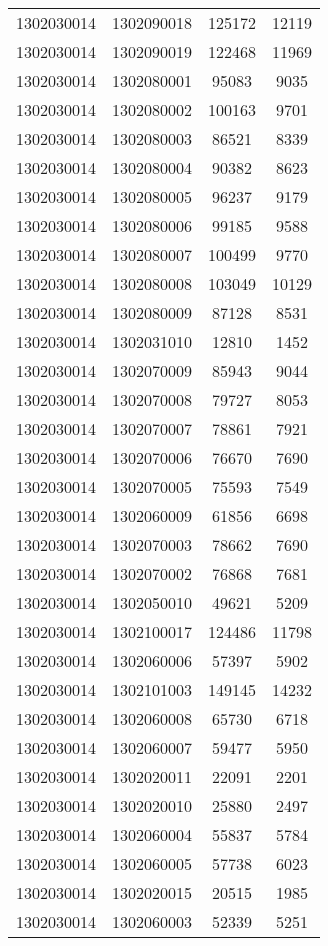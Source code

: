 \begin{longtable}[h]{llcc}
		1302030014 & 1302090018 & 125172 & 12119\\
		1302030014 & 1302090019 & 122468 & 11969\\
		1302030014 & 1302080001 & 95083 & 9035\\
		1302030014 & 1302080002 & 100163 & 9701\\
		1302030014 & 1302080003 & 86521 & 8339\\
		1302030014 & 1302080004 & 90382 & 8623\\
		1302030014 & 1302080005 & 96237 & 9179\\
		1302030014 & 1302080006 & 99185 & 9588\\
		1302030014 & 1302080007 & 100499 & 9770\\
		1302030014 & 1302080008 & 103049 & 10129\\
		1302030014 & 1302080009 & 87128 & 8531\\
		1302030014 & 1302031010 & 12810 & 1452\\
		1302030014 & 1302070009 & 85943 & 9044\\
		1302030014 & 1302070008 & 79727 & 8053\\
		1302030014 & 1302070007 & 78861 & 7921\\
		1302030014 & 1302070006 & 76670 & 7690\\
		1302030014 & 1302070005 & 75593 & 7549\\
		1302030014 & 1302060009 & 61856 & 6698\\
		1302030014 & 1302070003 & 78662 & 7690\\
		1302030014 & 1302070002 & 76868 & 7681\\
		1302030014 & 1302050010 & 49621 & 5209\\
		1302030014 & 1302100017 & 124486 & 11798\\
		1302030014 & 1302060006 & 57397 & 5902\\
		1302030014 & 1302101003 & 149145 & 14232\\
		1302030014 & 1302060008 & 65730 & 6718\\
		1302030014 & 1302060007 & 59477 & 5950\\
		1302030014 & 1302020011 & 22091 & 2201\\
		1302030014 & 1302020010 & 25880 & 2497\\
		1302030014 & 1302060004 & 55837 & 5784\\
		1302030014 & 1302060005 & 57738 & 6023\\
		1302030014 & 1302020015 & 20515 & 1985\\
		1302030014 & 1302060003 & 52339 & 5251\\

\end{longtable}
